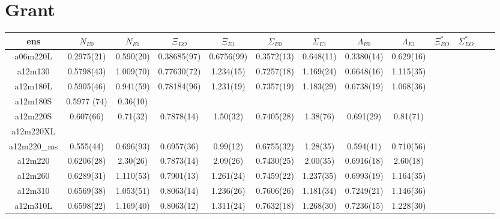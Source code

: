\documentclass{article}
\begin{document}
\clearpage
\section*{Grant}
\begin{table}[h!]
  \centering
 \setlength{\arrayrulewidth}{0.5mm}
\setlength{\tabcolsep}{13pt}
\renewcommand{\arraystretch}{2}
 \begin{tabular}{|| c |c | c | c | c | c | c | c | c | c | c | c | c ||} 
 \hline
 ens & $N_{E0}$ & $N_{E1}$ & $\Xi_{EO}$ &  $\Xi_{E1}$ & $\Sigma_{E0}$ & $\Sigma_{E1}$ & $\Lambda_{E0}$ & $\Lambda_{E1}$ & $\Xi^*_{EO}$ &  $\Sigma^*_{EO}$  \\ [0.8ex] 
 \hline\hline
 a06m220L 
  & {0.2975(21)}   &   {0.590(20)} & {0.38685(97)}   & {0.6756(99)}   & {0.3572(13)}  & {0.648(11)}   & {0.3380(14)}  & {0.629(16)}  & {}  & {}   \\
 \hline
 a12m130 
  & {0.5798(43)}   &   {1.009(70)} & {0.77630(72)}   & {1.234(15)}   & {0.7257(18)}  & {1.169(24)}   & {0.6648(16)}  & {1.115(35)}  & {}  & {}  &  \\
  \hline
 a12m180L 
 & {0.5905(46)}   &   { 0.941(59)} & {0.78184(96)}   & {1.231(19)}   & {0.7357(19)}  & {1.183(29)}   & {0.6738(19)}  & {1.068(36)}  & {}  & {}  &  \\ 
 \hline
 a12m180S 
 & {0.5977 (74)}   &   {0.36(10)} & {}   & {}   & {}  & {}   & {}  & {}  & {}  & {}  &  \\
 \hline
 a12m220S
 & {0.607(66)}   &   { 0.71(32)} & {0.7878(14)}  & {1.50(32)}   & {0.7405(28)}  & {1.38(76)}   & {0.691(29)}  & {0.81(71)}  & {}  & {}  &  \\
 \hline
 a12m220XL
  & {}   &   {} & {}   & {}   & {}  & {}   & {}  & {}  & {}  & {}  &  \\
 \hline
 a12m220_{ms}
  & {0.555(44)}   &   {0.696(93)} & {0.6957(36)}   & {0.99(12)}   & {0.6755(32)}  & {1.28(35)}   & {0.594(41)}  & {0.710(56)}  & {}  & {}  &  \\
 \hline
 a12m220 
  & {0.6206(28)}   &   {2.30(26)} & {0.7873(14)}   & {2.09(26)}   & {0.7430(25)}  & {2.00(35)}   & {0.6916(18)}  & {2.60(18)}  & {}  & {}  &  \\
 \hline
 a12m260 
  & {0.6289(31)}   &   {1.110(53)} & {0.7901(13)}   & {1.261(24)}   & {0.7459(22)}  & {1.237(35)}   & {0.6993(19)}  & {1.164(35)}  & {}  & {}  &  \\
 
 \hline
 a12m310
  & {0.6569(38)}   &   {1.053(51)} & {0.8063(14)}   & {1.236(26)}   & {0.7606(26)}  & {1.181(34)}   & {0.7249(21)}  & {1.146(36)}  & {}  & {}  &  \\
 \hline
 a12m310L
  & {0.6598(22)}   &   {1.169(40)} & {0.8063(12)}   & {1.311(24)}   & {0.7632(18)}  & {1.268(30)}   & {0.7236(15)}  & {1.228(30)}  & {}  & {}  &  \\
 \hline

 
 
 \end{tabular}
\end{table}
\end{document}
